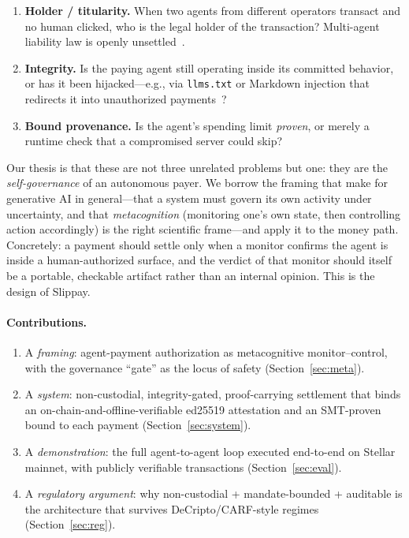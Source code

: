 \documentclass[11pt]{article}
\begin{document}
\begin{enumerate}
  \item \textbf{Holder / titularity.} When two agents from different operators transact and no
  human clicked, who is the legal holder of the transaction? Multi-agent liability law is openly
  unsettled~\citep{btlj,clsbluesky,countais,goodwin}.
  \item \textbf{Integrity.} Is the paying agent still operating inside its committed behavior,
  or has it been hijacked---e.g., via \texttt{llms.txt} or Markdown injection that redirects it
  into unauthorized payments~\citep{onesec,agentshield}?
  \item \textbf{Bound provenance.} Is the agent's spending limit \emph{proven}, or merely a
  runtime check that a compromised server could skip?
\end{enumerate}

Our thesis is that these are not three unrelated problems but one: they are the
\emph{self-governance} of an autonomous payer. We borrow the framing that
\citet{metaframework} make for generative AI in general---that a system must govern its own
activity under uncertainty, and that \emph{metacognition} (monitoring one's own state, then
controlling action accordingly) is the right scientific frame---and apply it to the money path.
Concretely: a payment should settle only when a monitor confirms the agent is inside a
human-authorized surface, and the verdict of that monitor should itself be a portable,
checkable artifact rather than an internal opinion. This is the design of Slippay.

\paragraph{Contributions.}
\begin{enumerate}
  \item A \emph{framing}: agent-payment authorization as metacognitive monitor--control, with
  the governance ``gate'' as the locus of safety (Section~\ref{sec:meta}).
  \item A \emph{system}: non-custodial, integrity-gated, proof-carrying settlement that binds an
  on-chain-and-offline-verifiable ed25519 attestation and an SMT-proven bound to each payment
  (Section~\ref{sec:system}).
  \item A \emph{demonstration}: the full agent-to-agent loop executed end-to-end on Stellar
  mainnet, with publicly verifiable transactions (Section~\ref{sec:eval}).
  \item A \emph{regulatory argument}: why non-custodial + mandate-bounded + auditable is the
  architecture that survives DeCripto/CARF-style regimes (Section~\ref{sec:reg}).
\end{enumerate}
\end{document}
